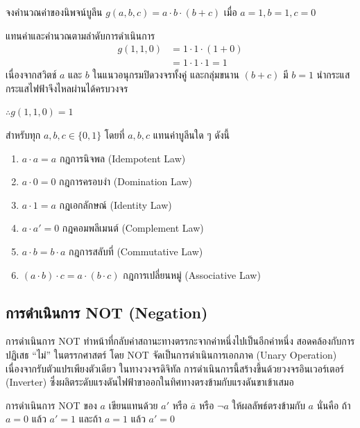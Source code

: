 \begin{ex}
\label{ex:eval-and-expression}
จงคำนวณค่าของนิพจน์บูลีน $g(a, b, c) = a \cdot b \cdot (b + c)$ เมื่อ $a = 1, b = 1, c = 0$
\end{ex}
\begin{solution}
แทนค่าและคำนวณตามลำดับการดำเนินการ
\begin{align*}
g(1, 1, 0) &= 1 \cdot 1 \cdot (1 + 0) \\
           &= 1 \cdot 1 \cdot 1 = 1
\end{align*}
เนื่องจากสวิตช์ $a$ และ $b$ ในแนวอนุกรมปิดวงจรทั้งคู่ และกลุ่มขนาน $(b+c)$ มี $b=1$ นำกระแส กระแสไฟฟ้าจึงไหลผ่านได้ครบวงจร

$\therefore g(1,1,0) = 1$ \solhere
\end{solution}

\begin{prop}
สำหรับทุก $a, b, c \in \{0, 1\}$ โดยที่ $a, b, c$ แทนค่าบูลีนใด ๆ ดังนี้

\begin{enumerate}
    \item $a \cdot a = a$ \hfill กฎการนิจพล (Idempotent Law)
    \item $a \cdot 0 = 0$ \hfill กฎการครอบงำ (Domination Law)
    \item $a \cdot 1 = a$ \hfill กฎเอกลักษณ์ (Identity Law)
    \item $a \cdot a' = 0$ \hfill กฎคอมพลีเมนต์ (Complement Law)
    \item $a \cdot b = b \cdot a$ \hfill กฎการสลับที่ (Commutative Law)
    \item $(a \cdot b) \cdot c = a \cdot (b \cdot c)$ \hfill กฎการเปลี่ยนหมู่ (Associative Law)
\end{enumerate}
\end{prop}

\subsection{การดำเนินการ NOT (Negation)}
การดำเนินการ NOT ทำหน้าที่กลับค่าสถานะทางตรรกะจากค่าหนึ่งไปเป็นอีกค่าหนึ่ง สอดคล้องกับการปฏิเสธ ``ไม่'' ในตรรกศาสตร์ โดย NOT จัดเป็นการดำเนินการเอกภาค (Unary Operation) เนื่องจากรับตัวแปรเพียงตัวเดียว ในทางวงจรดิจิทัล การดำเนินการนี้สร้างขึ้นด้วยวงจรอินเวอร์เตอร์ (Inverter) ซึ่งผลิตระดับแรงดันไฟฟ้าขาออกในทิศทางตรงข้ามกับแรงดันขาเข้าเสมอ~\parencite{wakerly2018digital}

\begin{definition}
การดำเนินการ NOT ของ $a$ เขียนแทนด้วย $a'$ หรือ $\overline{a}$ หรือ $\neg a$ ให้ผลลัพธ์ตรงข้ามกับ $a$ นั่นคือ ถ้า $a = 0$ แล้ว $a' = 1$ และถ้า $a = 1$ แล้ว $a' = 0$
\end{definition}


